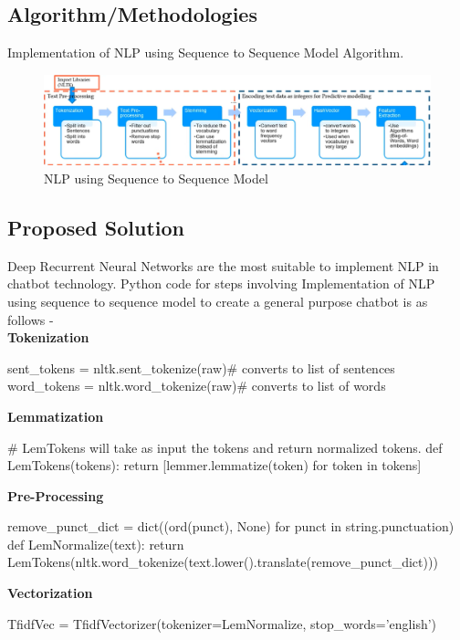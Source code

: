 \documentclass[12pt,a4paper]{report}     %
\begin{document}
\begin{normalsize}
{%
\newpage 
\chapter{}
{\setlength{\baselineskip}{1.1\baselineskip}

\section{Algorithm/Methodologies}
{\setlength{\baselineskip}{1.1\baselineskip}
Implementation of NLP using Sequence to Sequence Model Algorithm.
\begin{figure}[htp]
    \centering
    \includegraphics[width=16cm]{nlp steps.png}
    \caption{NLP using Sequence to Sequence Model}
    \label{fig:nlpsteps}
\end{figure} 
}
\section{Proposed Solution}
{\setlength{\baselineskip}{1.1\baselineskip}
Deep Recurrent Neural Networks are the most suitable to implement NLP in chatbot technology. Python code for steps involving Implementation of NLP using sequence to sequence model to create a general purpose chatbot is as follows - \\
{\bf Tokenization} 
\begin{python}
sent_tokens = nltk.sent_tokenize(raw)# converts to list of sentences
word_tokens = nltk.word_tokenize(raw)# converts to list of words
\end{python}
{\bf Lemmatization} 
\begin{python}
# LemTokens will take as input the tokens and return normalized tokens.
def LemTokens(tokens):
   return [lemmer.lemmatize(token) for token in tokens]
\end{python}
{\bf Pre-Processing} 
\begin{python}
remove_punct_dict = dict((ord(punct), None) for punct in string.punctuation)
def LemNormalize(text):
   return LemTokens(nltk.word_tokenize(text.lower().translate(remove_punct_dict)))
\end{python}
{\bf Vectorization} 
\begin{python}
 TfidfVec = TfidfVectorizer(tokenizer=LemNormalize, stop_words='english')
\end{python}
}

}}
\end{normalsize}
\end{document}
